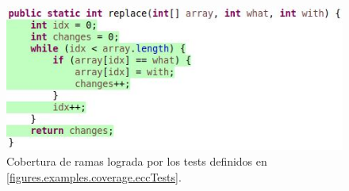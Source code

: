 \begin{figure}
	\includegraphics[width=\linewidth]{figures/replaceFullCoverage.JPG}
	\caption{Cobertura de ramas lograda por los tests definidos en \ref{figures.examples.coverage.eccTests}.}
	\label{figures.examples.coverage.eccCoverage}
\end{figure}
